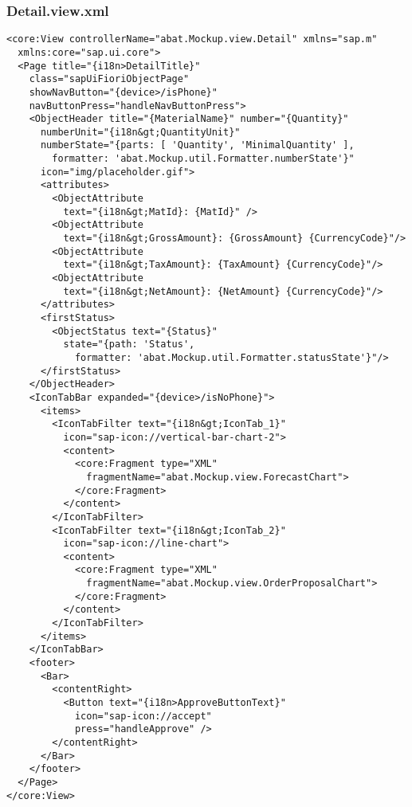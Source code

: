 \newpage
\subsubsection*{Detail.view.xml}
\begin{lstlisting}[language=HTML5, label=lst:Detail.view.xml]
<core:View controllerName="abat.Mockup.view.Detail" xmlns="sap.m"
  xmlns:core="sap.ui.core">
  <Page title="{i18n>DetailTitle}"
    class="sapUiFioriObjectPage"
    showNavButton="{device>/isPhone}" 
    navButtonPress="handleNavButtonPress">
    <ObjectHeader title="{MaterialName}" number="{Quantity}"
      numberUnit="{i18n&gt;QuantityUnit}"
      numberState="{parts: [ 'Quantity', 'MinimalQuantity' ],
        formatter: 'abat.Mockup.util.Formatter.numberState'}"
      icon="img/placeholder.gif">
      <attributes>
        <ObjectAttribute 
          text="{i18n&gt;MatId}: {MatId}" />
        <ObjectAttribute
          text="{i18n&gt;GrossAmount}: {GrossAmount} {CurrencyCode}"/>
        <ObjectAttribute
          text="{i18n&gt;TaxAmount}: {TaxAmount} {CurrencyCode}"/>
        <ObjectAttribute
          text="{i18n&gt;NetAmount}: {NetAmount} {CurrencyCode}"/>
      </attributes>
      <firstStatus>
        <ObjectStatus text="{Status}"
          state="{path: 'Status',
            formatter: 'abat.Mockup.util.Formatter.statusState'}"/>
      </firstStatus>
    </ObjectHeader>
    <IconTabBar expanded="{device>/isNoPhone}">
      <items>
        <IconTabFilter text="{i18n&gt;IconTab_1}"
          icon="sap-icon://vertical-bar-chart-2">
          <content>
            <core:Fragment type="XML"
              fragmentName="abat.Mockup.view.ForecastChart">
            </core:Fragment>
          </content>
        </IconTabFilter>
        <IconTabFilter text="{i18n&gt;IconTab_2}"
          icon="sap-icon://line-chart">
          <content>
            <core:Fragment type="XML"
              fragmentName="abat.Mockup.view.OrderProposalChart">
            </core:Fragment>
          </content>
        </IconTabFilter>
      </items>
    </IconTabBar>
    <footer>
      <Bar>
        <contentRight>
          <Button text="{i18n>ApproveButtonText}"
            icon="sap-icon://accept"
            press="handleApprove" />
        </contentRight>
      </Bar>
    </footer>
  </Page>
</core:View>
\end{lstlisting}

\newpage
